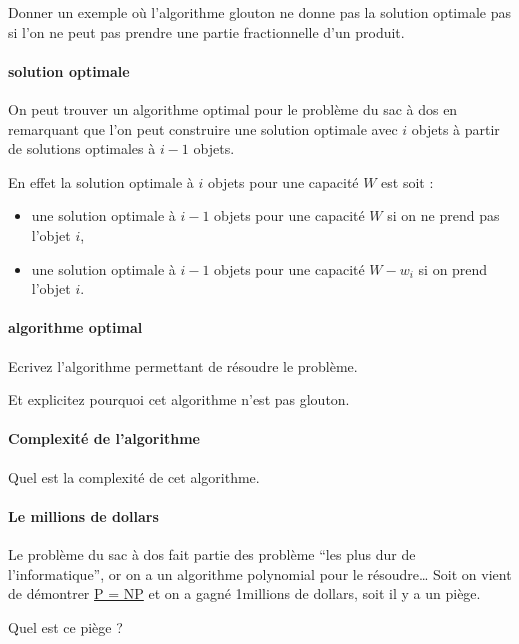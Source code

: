 \documentclass[
]{article}
\providecommand{\tightlist}{%
  \setlength{\itemsep}{0pt}\setlength{\parskip}{0pt}}
\begin{document}
Donner un exemple où l'algorithme glouton ne donne pas la solution
optimale pas si l'on ne peut pas prendre une partie fractionnelle d'un
produit.

\hypertarget{solution-optimale}{%
\paragraph{solution optimale}\label{solution-optimale}}

On peut trouver un algorithme optimal pour le problème du sac à dos en
remarquant que l'on peut construire une solution optimale avec \(i\)
objets à partir de solutions optimales à \(i-1\) objets.

En effet la solution optimale à \(i\) objets pour une capacité \(W\) est
soit :

\begin{itemize}
\tightlist
\item
  une solution optimale à \(i-1\) objets pour une capacité \(W\) si on
  ne prend pas l'objet \(i\),
\item
  une solution optimale à \(i-1\) objets pour une capacité \(W - w_i\)
  si on prend l'objet \(i\).
\end{itemize}

\hypertarget{algorithme-optimal}{%
\paragraph{algorithme optimal}\label{algorithme-optimal}}

Ecrivez l'algorithme permettant de résoudre le problème.

Et explicitez pourquoi cet algorithme n'est pas glouton.

\hypertarget{complexituxe9-de-lalgorithme}{%
\paragraph{Complexité de
l'algorithme}\label{complexituxe9-de-lalgorithme}}

Quel est la complexité de cet algorithme.

\hypertarget{le-millions-de-dollars}{%
\paragraph{Le millions de dollars}\label{le-millions-de-dollars}}

Le problème du sac à dos fait partie des problème ``les plus dur de
l'informatique'', or on a un algorithme polynomial pour le
résoudre\ldots{} Soit on vient de démontrer
\href{https://fr.wikipedia.org/wiki/Probl\%C3\%A8mes_du_prix_du_mill\%C3\%A9naire\#Probl\%C3\%A8me_ouvert_P_=_NP}{P
= NP} et on a gagné 1millions de dollars, soit il y a un piège.

Quel est ce piège ?
\end{document}
